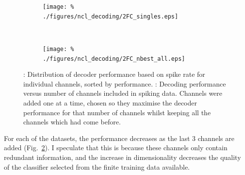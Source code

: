 \begin{figure}[htbp]
    \begin{subfigure}[b]{0.5\linewidth}
        \centering
        \caption{}
        \label{fig:dec_singles}
        \texttt{[image: \%
./figures/ncl\_decoding/2FC\_singles.eps]}
    \end{subfigure}
    ~~
    \begin{subfigure}[b]{0.5\linewidth}
        \centering
        \caption{}
        \label{fig:dec_nbest}
        \texttt{[image: \%
./figures/ncl\_decoding/2FC\_nbest\_all.eps]}
    \end{subfigure}
    \caption{
\protect{}: Distribution of decoder performance based on spike rate for individual channels, sorted by performance.
\protect{}: Decoding performance versus number of channels included in spiking data. Channels were added one at a time, chosen so they maximise the decoder performance for that number of channels whilst keeping all the channels which had come before.
}
    \label{fig:dec_n}
\end{figure}

For each of the datasets, the performance decreases as the last 3 channels are added (Fig.~\ref{fig:dec_nbest}). I speculate that this is because these channels only contain redundant information, and the increase in dimensionality decreases the quality of the classifier selected from the finite training data available.


